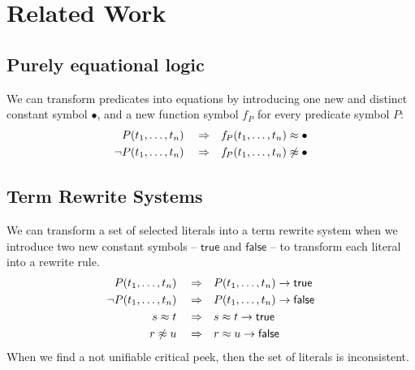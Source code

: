 
\chapter{Related Work}


\section{Purely equational logic}

We can transform predicates into equations
by introducing one new and distinct constant symbol $\bullet$,
and a new function symbol $f\!_P$ for every predicate symbol $P$:
\begin{align*}
	P(t_1,\ldots,t_n) \quad\Rightarrow&\quad f\!_P(t_1,\ldots,t_n) \approx \bullet \\ 
	\lnot P(t_1,\ldots,t_n) \quad\Rightarrow&\quad f\!_P(t_1,\ldots,t_n) \not\approx \bullet
\end{align*}

\section{Term Rewrite Systems}

We can transform a set of selected literals into a term rewrite system 
when we introduce two new constant symbols -- $\mathsf{true}$ and $\mathsf{false}$ --
to transform each literal into a rewrite rule.
\begin{align*}
P(t_1,\ldots,t_n) \quad\Rightarrow &\quad P(t_1,\ldots,t_n) \rightarrow \mathsf{true} 
\\ 
\lnot P(t_1,\ldots,t_n) \quad\Rightarrow &\quad P(t_1,\ldots,t_n) \rightarrow \mathsf{false} 
\\
s \approx t \quad\Rightarrow&\quad s \approx t\rightarrow \mathsf{true} 
\\ 
r \not\approx u \quad\Rightarrow&\quad r \approx u\rightarrow  \mathsf{false}
\end{align*}
When we find a not unifiable critical peek, then the set of literals is inconsistent.

